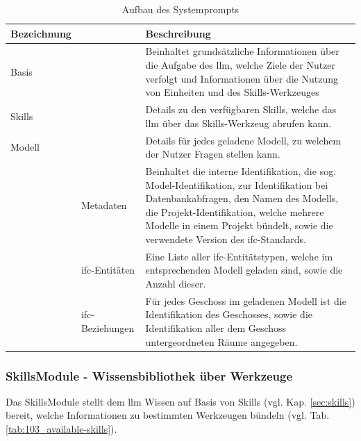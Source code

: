 \begin{table}[!htb]
    \centering
    \caption{Aufbau des Systemprompts}
    \label{tab:103_system-prompt}
    \begin{tabular}{C{2cm} C{3cm} L{8cm}}
        \hline
        \textbf{Bezeichnung} & & \textbf{Beschreibung} \\
        \hline

        Basis & & Beinhaltet grundsätzliche Informationen über die Aufgabe des \gls{llm}, welche Ziele der Nutzer verfolgt und Informationen über die Nutzung von Einheiten und des Skills-Werkzeuges \\

        \hline

        Skills & & Details zu den verfügbaren Skills, welche das \gls{llm} über das Skills-Werkzeug abrufen kann. \\

        \hline

        Modell & & Details für jedes geladene Modell, zu welchem der Nutzer Fragen stellen kann. \\

        & Metadaten & Beinhaltet die interne Identifikation, die sog. Model-Identifikation, zur Identifikation bei Datenbankabfragen, den Namen des Modells, die Projekt-Identifikation, welche mehrere Modelle in einem Projekt bündelt, sowie die verwendete Version des \gls{ifc}-Standards. \\

        & \gls{ifc}-Entitäten & Eine Liste aller \gls{ifc}-Entitätstypen, welche im entsprechenden Modell geladen sind, sowie die Anzahl dieser. \\

        & \gls{ifc}-Beziehungen & Für jedes Geschoss im geladenen Modell ist die Identifikation des Geschosses, sowie die Identifikation aller dem Geschoss untergeordneten Räume angegeben. \\

        \hline
    \end{tabular}
\end{table}

\subsubsection{SkillsModule - Wissensbibliothek über Werkzeuge}
\label{sec:app-skillsmodule}

Das SkillsModule stellt dem \gls{llm} Wissen auf Basis von Skills (vgl. Kap. \ref{sec:skills}) bereit,
welche Informationen zu bestimmten Werkzeugen bündeln (vgl. Tab. \ref{tab:103_available-skills}). \\

